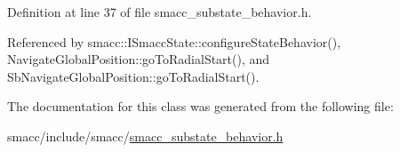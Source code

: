Definition at line 37 of file smacc\+\_\+substate\+\_\+behavior.\+h.



Referenced by smacc\+::\+I\+Smacc\+State\+::configure\+State\+Behavior(), Navigate\+Global\+Position\+::go\+To\+Radial\+Start(), and Sb\+Navigate\+Global\+Position\+::go\+To\+Radial\+Start().



The documentation for this class was generated from the following file\+:\begin{DoxyCompactItemize}
\item 
smacc/include/smacc/\hyperlink{smacc__substate__behavior_8h}{smacc\+\_\+substate\+\_\+behavior.\+h}\end{DoxyCompactItemize}

